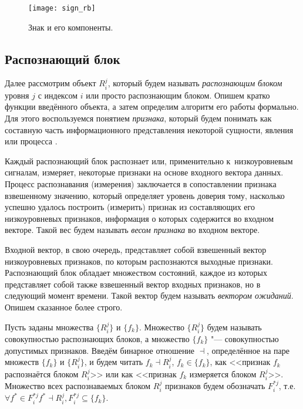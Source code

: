 \begin{figure}[h]
	\centering
    \texttt{[image: sign\_rb]}
    \caption{Знак и его компоненты.}
    \label{fg:sign_rb}
\end{figure}

\subsection{Распознающий блок} \label{sect:recogn_block}
Далее рассмотрим объект $R_i^j$, который будем называть \textit{распознающим блоком} уровня $j$ с индексом $i$ или просто распознающим блоком. Опишем кратко функции введённого объекта, а затем определим алгоритм его работы формально.  Для этого воспользуемся понятием \textit{признака}, который будем понимать как составную часть информационного представления некоторой сущности, явления или процесса \cite{Vapnik1974}.

Каждый распознающий блок распознает или, применительно к~низкоуровневым сигналам, измеряет, некоторые признаки на основе входного вектора данных.  Процесс распознавания (измерения) заключается в сопоставлении признака взвешенному значению, который определяет уровень доверия тому, насколько успешно удалось построить (измерить) признак из составляющих его низкоуровневых признаков, информация о которых содержится во входном векторе. Такой вес будем называть \textit{весом признака} во входном векторе.

Входной вектор, в свою очередь, представляет собой взвешенный вектор низкоуровневых признаков, по которым распознаются выходные признаки. Распознающий блок обладает множеством состояний, каждое из которых представляет собой также взвешенный вектор входных признаков, но в следующий момент времени. Такой вектор будем называть \textit{вектором ожиданий}. Опишем сказанное более строго.

Пусть заданы множества $\{R_i^j\}$ и $\{f_k\}$. Множество $\{R_i^j\}$ будем называть совокупностью распознающих блоков, а множество $\{f_k\}$ "--- совокупностью допустимых признаков. Введём бинарное отношение $\dashv$, определённое на паре множеств $\{f_k\}$ и $\{R_i^j\}$, и будем читать $f_k{\dashv}R_i^j$, $f_k\in\{f_k\}$, как <<признак $f_k$ распознаётся блоком $R_i^j$>> или как <<признак $f_k$ измеряется блоком $R_i^j$>>. Множество всех распознаваемых блоком $R_i^j$ признаков будем обозначать $F_i^{*j}$, т.е. ${\forall}f^*{\in}F_i^{*j} f^*{\dashv}R_i^j, F_i^{*j}{\subseteq}\{f_k\}$.

